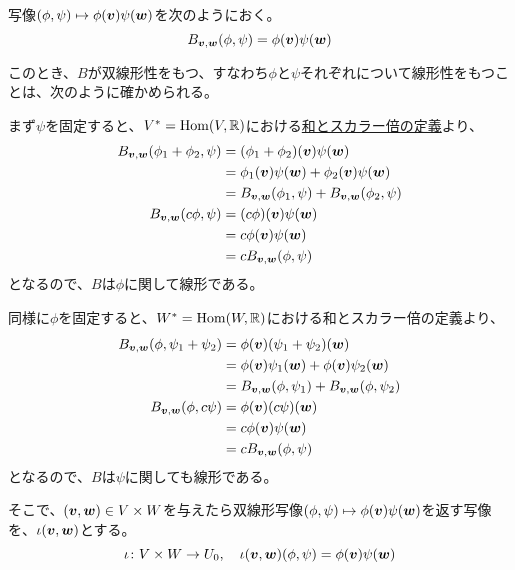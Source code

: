 \documentclass[../../../topic_linear-algebra]{subfiles}
\begin{document}
\br

\begin{handout}[補足:なぜ双線形写像だといえる？]
  写像$(\phi, \psi) \mapsto \phi(\vb*{v}) \psi(\vb*{w})$を次のようにおく。
  \begin{equation*}
    B_{\vb*{v}, \vb*{w}}(\phi, \psi) = \phi(\vb*{v}) \psi(\vb*{w})
  \end{equation*}
  
  このとき、$B$が双線形性をもつ、すなわち$\phi$と$\psi$それぞれについて線形性をもつことは、次のように確かめられる。
  
  \br
  
  まず$\psi$を固定すると、$V^* = \operatorname{Hom}(V, \mathbb{R})$における\hyperref[def:linear-map-addition-scalar]{和とスカラー倍の定義}より、
  \begin{align*}
    B_{\vb*{v}, \vb*{w}}(\phi_1 + \phi_2, \psi) &= (\phi_1 + \phi_2)(\vb*{v}) \psi(\vb*{w}) \\
    &= \phi_1(\vb*{v}) \psi(\vb*{w}) + \phi_2(\vb*{v}) \psi(\vb*{w}) \\
    &= B_{\vb*{v}, \vb*{w}}(\phi_1, \psi) + B_{\vb*{v}, \vb*{w}}(\phi_2, \psi) \\
    B_{\vb*{v}, \vb*{w}}(c\phi, \psi) &= (c\phi)(\vb*{v}) \psi(\vb*{w}) \\
    &= c\phi(\vb*{v}) \psi(\vb*{w}) \\
    &= cB_{\vb*{v}, \vb*{w}}(\phi, \psi)
  \end{align*}
  となるので、$B$は$\phi$に関して線形である。
  
  \br
  
  同様に$\phi$を固定すると、$W^* = \operatorname{Hom}(W, \mathbb{R})$における和とスカラー倍の定義より、
  \begin{align*}
    B_{\vb*{v}, \vb*{w}}(\phi, \psi_1 + \psi_2) &= \phi(\vb*{v}) (\psi_1 + \psi_2)(\vb*{w}) \\
    &= \phi(\vb*{v}) \psi_1(\vb*{w}) + \phi(\vb*{v}) \psi_2(\vb*{w}) \\
    &= B_{\vb*{v}, \vb*{w}}(\phi, \psi_1) + B_{\vb*{v}, \vb*{w}}(\phi, \psi_2) \\
    B_{\vb*{v}, \vb*{w}}(\phi, c\psi) &= \phi(\vb*{v}) (c\psi)(\vb*{w}) \\
    &= c\phi(\vb*{v}) \psi(\vb*{w}) \\
    &= cB_{\vb*{v}, \vb*{w}}(\phi, \psi)
  \end{align*}
  となるので、$B$は$\psi$に関しても線形である。
\end{handout}

そこで、$(\vb*{v}, \vb*{w}) \in V \times W$を与えたら双線形写像$(\phi, \psi) \mapsto \phi(\vb*{v}) \psi(\vb*{w})$を返す写像を、$\iota(\vb*{v}, \vb*{w})$とする。
\begin{equation*}
  \iota \colon V \times W \to U_0, \quad \iota(\vb*{v}, \vb*{w})(\phi, \psi) = \phi(\vb*{v}) \psi(\vb*{w})
\end{equation*}
\end{document}

